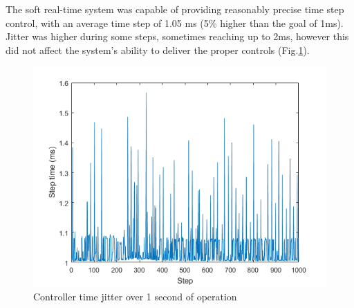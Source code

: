 \documentclass[12pt]{report}
\begin{document}
	  	The soft real-time system was capable of providing reasonably precise time step control, with an average time step of 1.05 ms (5\% higher than the goal of 1ms). Jitter was higher during some steps, sometimes reaching up to 2ms, however this did not affect the system's ability to deliver the proper controls (Fig.\ref{fig:jitter}). 


\begin{figure}[t] 
	\centering
	\includegraphics[width=0.9\linewidth]{time_jitter}
	\caption{Controller time jitter over 1 second of operation}
	\label{fig:jitter}
\end{figure}

	
\end{document}
